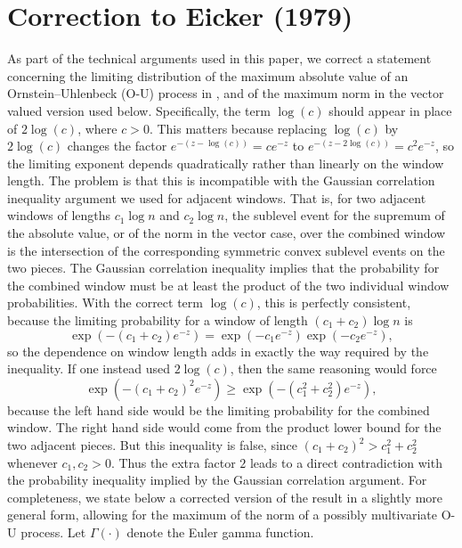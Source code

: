 \documentclass[10pt]{article}
\theoremstyle{definition}
\theoremstyle{remark}
\begin{document}
\section{Correction to Eicker (1979)}\label{sec: Appendix Correction}

As part of the technical arguments used in this paper, we correct a statement concerning the limiting distribution of the maximum absolute value of an Ornstein--Uhlenbeck (O-U) process in \citet[Theorem 5]{eicker1979asymptotic}, and of the maximum norm in the vector valued version used below. Specifically, the term $\log(c)$ should appear in place of $2\log(c)$, where $c> 0$. This matters because replacing $\log(c)$ by $2\log(c)$ changes the factor $e^{-(z-\log(c))}=ce^{-z}$ to $e^{-(z-2\log(c))}=c^2e^{-z}$, so the limiting exponent depends quadratically rather than linearly on the window length. The problem is that this is incompatible with the Gaussian correlation inequality argument we used for adjacent windows. That is, for two adjacent windows of lengths $c_1\log n$ and $c_2\log n$, the sublevel event for the supremum of the absolute value, or of the norm in the vector case, over the combined window is the intersection of the corresponding symmetric convex sublevel events on the two pieces. The Gaussian correlation inequality implies that the probability for the combined window must be at least the product of the two individual window probabilities. With the correct term $\log(c)$, this is perfectly consistent, because the limiting probability for a window of length $(c_1+c_2)\log n$ is
\[
\exp(-(c_1+c_2)e^{-z})
=
\exp(-c_1e^{-z})\exp(-c_2e^{-z}),
\]
so the dependence on window length adds in exactly the way required by the inequality. If one instead used $2\log(c)$, then the same reasoning would force
\[
\exp(-(c_1+c_2)^2e^{-z})
\ge
\exp(-(c_1^2+c_2^2)e^{-z}),
\]
because the left hand side would be the limiting probability for the combined window. The right hand side would come from the product lower bound for the two adjacent pieces. But this inequality is false, since $(c_1+c_2)^2>c_1^2+c_2^2$ whenever $c_1,c_2>0$. Thus the extra factor $2$ leads to a direct contradiction with the probability inequality implied by the Gaussian correlation argument.
For completeness, we state below a corrected version of the result in a slightly more general form, allowing for the maximum of the norm of a possibly multivariate O-U process. Let $\Gamma(\cdot)$ denote the Euler gamma function.
\end{document}
